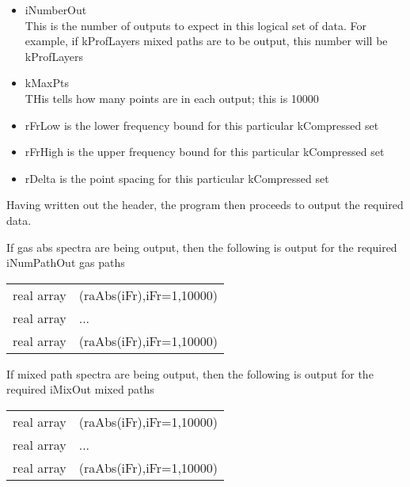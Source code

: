 \documentclass[12pt]{article}
\newlength{\colwidth}
\begin{document}
{{{{\begin{itemize}
\item iNumberOut\\
      This is the number of outputs to expect in this logical set of data. 
      For example, if kProfLayers mixed paths are to be output, this number 
      will be kProfLayers\\      

\item kMaxPts\\
      THis tells how many points are in each output; this is 10000\\

\item rFrLow is the lower frequency bound for this particular kCompressed set\\

\item rFrHigh is the upper frequency bound for this particular kCompressed 
      set\\

\item rDelta is the point spacing for this particular kCompressed set\\

\end{itemize}


Having written out the header, the program then proceeds to output the 
required data. 

\medskip
\noindent If gas abs spectra are being output, then the following is output 
for the required iNumPathOut gas paths \\
\begin{longtable}{lp{\colwidth}}
{\sf real array} & \indent (raAbs(iFr),iFr=1,10000)\\
{\sf real array} & \indent ...\\
{\sf real array} & \indent (raAbs(iFr),iFr=1,10000)\\
\end{longtable}

\medskip
\noindent If mixed path spectra are being output, then the following is output 
for the required iMixOut mixed paths \\
\begin{longtable}{lp{\colwidth}}
{\sf real array} & \indent (raAbs(iFr),iFr=1,10000)\\
{\sf real array} & \indent ...\\
{\sf real array} & \indent (raAbs(iFr),iFr=1,10000)\\
\end{longtable}

}}}}
\end{document}
